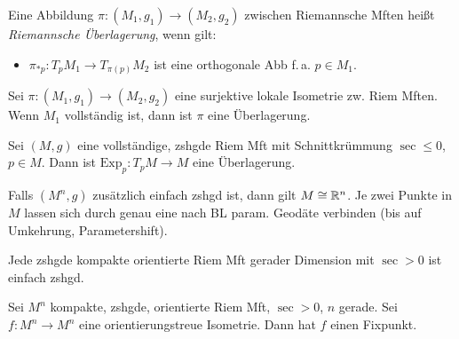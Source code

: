 \documentclass{cheat-sheet}
\newcommand{\Exp}{\mathrm{Exp}} %
\begin{document}
\begin{defn}
  Eine Abbildung $\pi : (M_1, g_1) \to (M_2, g_2)$ zwischen Riemannsche Mften heißt \emph{Riemannsche Überlagerung}, wenn gilt:
  \begin{itemize}
    \item $\pi_{*p} : T_p M_1 \to T_{\pi(p)} M_2$ ist eine orthogonale Abb f.\,a. $p \in M_1$.
  \end{itemize}
\end{defn}

\begin{satz}
  Sei $\pi : (M_1, g_1) \to (M_2, g_2)$ eine surjektive lokale Isometrie zw. Riem Mften. Wenn $M_1$ vollständig ist, dann ist $\pi$ eine Überlagerung.
\end{satz}

\begin{satz}
  Sei $(M, g)$ eine vollständige, zshgde Riem Mft mit Schnittkrümmung $\sec \leq 0$, $p \in M$. Dann ist $\Exp_p : T_p M \to M$ eine Überlagerung.
\end{satz}


\begin{kor}
  Falls $(M^n, g)$ zusätzlich einfach zshgd ist, dann gilt $M \cong \mathbb{R}^n$.
  Je zwei Punkte in $M$ lassen sich durch genau eine nach BL param. Geodäte verbinden (bis auf Umkehrung, Parametershift).
\end{kor}


\begin{satz}
  Jede zshgde kompakte orientierte Riem Mft gerader Dimension mit $\sec > 0$ ist einfach zshgd.
\end{satz}

\begin{satz}
  Sei $M^n$ kompakte, zshgde, orientierte Riem Mft, $\sec > 0$, $n$ gerade. Sei $f : M^n \to M^n$ eine orientierungstreue Isometrie. Dann hat $f$ einen Fixpunkt.
\end{satz}
\end{document}
